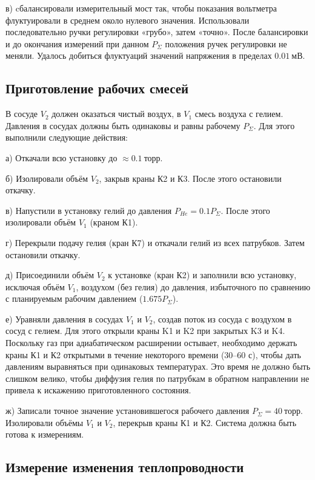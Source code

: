в) cбалансировали измерительный мост так, чтобы показания вольтметра флуктуировали в среднем около нулевого значения. Использовали последовательно ручки регулировки «грубо», затем «точно». После балансировки и до окончания измерений при данном $P_{\Sigma}$ положения ручек регулировки не меняли. Удалось добиться флуктуаций значений напряжения в пределах $0.01~\text{мВ}$.

\subsection{Приготовление рабочих смесей}

В сосуде $V_2$ должен оказаться чистый воздух, в $V_1$ смесь воздуха с гелием. Давления в сосудах должны быть одинаковы и равны рабочему $P_{\Sigma}$. Для этого выполнили следующие действия:

а) Откачали всю установку до $\approx 0.1~\text{торр}$.

б) Изолировали объём $V_2$, закрыв краны К2 и К3. После этого остановили откачку.

в) Напустили в установку гелий до давления $P_{He} = 0.1P_{\Sigma}$. После этого изолировали объём $V_1$ (краном К1).

г) Перекрыли подачу гелия (кран К7) и откачали гелий из всех патрубков. Затем остановили откачку.

д) Присоединили объём $V_2$ к установке (кран К2) и заполнили всю установку, исключая объём $V_1$, воздухом (без гелия) до давления, избыточного по сравнению с планируемым рабочим давлением ($1.675P_{\Sigma}$).

е) Уравняли давления в сосудах $V_1$ и $V_2$, создав поток из сосуда с воздухом в сосуд с гелием. Для этого открыли краны K1 и K2 при закрытых K3 и K4. Поскольку газ при адиабатическом расширении остывает, необходимо держать краны К1 и К2 открытыми в течение некоторого времени (30–60 с), чтобы дать давлениям выравняться при одинаковых температурах. Это время не должно быть слишком велико, чтобы диффузия гелия по патрубкам в обратном направлении не привела к искажению приготовленного состояния.

ж) Записали точное значение установившегося рабочего давления $P_{\Sigma} = 40~\text{торр}$. Изолировали объёмы $V_1$ и $V_2$, перекрыв краны К1 и К2. Система должна быть готова к измерениям.

\subsection{Измерение изменения теплопроводности}

